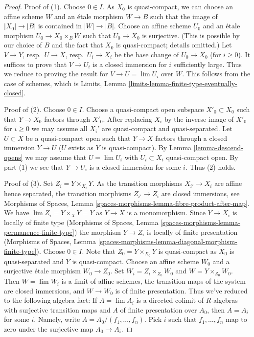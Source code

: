 \begin{proof}
Proof of (1). Choose $0 \in I$. As $X_0$ is quasi-compact, we can choose
an affine scheme $W$ and an \'etale morphism $W \to B$ such that the image of
$|X_0| \to |B|$ is contained in $|W| \to |B|$. 
Choose an affine scheme $U_0$ and an \'etale morphism
$U_0 \to X_0 \times_B W$ such that $U_0 \to X_0$ is surjective.
(This is possible by our choice of $B$ and the fact that $X_0$ is
quasi-compact; details omitted.)
Let $V \to Y$, resp.\ $U \to X$, resp.\ $U_i \to X_i$ be the base change
of $U_0 \to X_0$ (for $i \geq 0$). It suffices to prove that $V \to U_i$
is a closed immersion for $i$ sufficiently large. Thus we reduce
to proving the result for $V \to U = \lim U_i$ over $W$. This follows from
the case of schemes, which is
Limits, Lemma \ref{limits-lemma-finite-type-eventually-closed}.

\medskip\noindent
Proof of (2). Choose $0 \in I$. Choose a quasi-compact open subspace
$X'_0 \subset X_0$ such that $Y \to X_0$ factors through $X'_0$.
After replacing $X_i$ by the inverse image of $X'_0$ for $i \geq 0$
we may assume all $X_i'$ are quasi-compact and quasi-separated.
Let $U \subset X$ be a quasi-compact open such that $Y \to X$ factors
through a closed immersion $Y \to U$ ($U$ exists as $Y$ is quasi-compact). By
Lemma \ref{lemma-descend-opens}
we may assume that $U = \lim U_i$ with $U_i \subset X_i$ quasi-compact
open. By part (1) we see that $Y \to U_i$ is a closed immersion for some
$i$. Thus (2) holds.

\medskip\noindent
Proof of (3). Set $Z_i = Y \times_{X_i} Y$.
As the transition morphisms $X_{i'} \to X_i$ are affine hence separated,
the transition morphisms $Z_{i'} \to Z_i$ are closed immersions, see
Morphisms of Spaces, Lemma
\ref{spaces-morphisms-lemma-fibre-product-after-map}.
We have $\lim Z_i = Y \times_X Y = Y$ as $Y \to X$ is a monomorphism.
Since $Y \to X_i$ is locally of finite type
(Morphisms of Spaces, Lemma
\ref{spaces-morphisms-lemma-permanence-finite-type})
the morphism $Y \to Z_i$ is locally of finite presentation
(Morphisms of Spaces, Lemma
\ref{spaces-morphisms-lemma-diagonal-morphism-finite-type}).
Choose $0 \in I$. Note that $Z_0 = Y \times_{X_0} Y$ is quasi-compact as
$X_0$ is quasi-separated and $Y$ is quasi-compact.
Choose an affine scheme $W_0$ and a surjective \'etale
morphism $W_0 \to Z_0$. Set $W_i = Z_i \times_{Z_0} W_0$ and
$W = Y \times_{Z_0} W_0$. Then $W = \lim W_i$ is a limit of affine
schemes, the transition maps of the system are closed immersions,
and $W \to W_0$ is of finite presentation.
Thus we've reduced to the following algebra fact: If $A = \lim A_i$
is a directed colimit of $R$-algebras with surjective transition
maps and $A$ of finite presentation over $A_0$, then $A = A_i$ for
some $i$. Namely, write $A = A_0/(f_1, \ldots, f_n)$. Pick $i$ such
that $f_1, \ldots, f_n$ map to zero under the surjective map $A_0 \to A_i$.
\end{proof}

